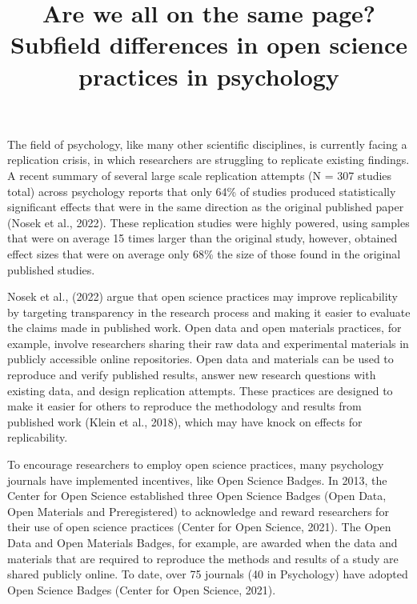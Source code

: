\documentclass[
  english,
  man,floatsintext]{apa6}
\title{Are we all on the same page? Subfield differences in open science practices in psychology}
\author{\phantom{0}}
\date{}
\affiliation{\phantom{0}}
\begin{document}
\maketitle

The field of psychology, like many other scientific disciplines, is currently facing a replication crisis, in which researchers are struggling to replicate existing findings. A recent summary of several large scale replication attempts (N = 307 studies total) across psychology reports that only 64\% of studies produced statistically significant effects that were in the same direction as the original published paper (Nosek et al., 2022). These replication studies were highly powered, using samples that were on average 15 times larger than the original study, however, obtained effect sizes that were on average only 68\% the size of those found in the original published studies.

Nosek et al., (2022) argue that open science practices may improve replicability by targeting transparency in the research process and making it easier to evaluate the claims made in published work. Open data and open materials practices, for example, involve researchers sharing their raw data and experimental materials in publicly accessible online repositories. Open data and materials can be used to reproduce and verify published results, answer new research questions with existing data, and design replication attempts. These practices are designed to make it easier for others to reproduce the methodology and results from published work (Klein et al., 2018), which may have knock on effects for replicability.

To encourage researchers to employ open science practices, many psychology journals have implemented incentives, like Open Science Badges. In 2013, the Center for Open Science established three Open Science Badges (Open Data, Open Materials and Preregistered) to acknowledge and reward researchers for their use of open science practices (Center for Open Science, 2021). The Open Data and Open Materials Badges, for example, are awarded when the data and materials that are required to reproduce the methods and results of a study are shared publicly online. To date, over 75 journals (40 in Psychology) have adopted Open Science Badges (Center for Open Science, 2021).
\end{document}

